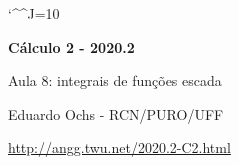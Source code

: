\documentclass[oneside,12pt]{article}
\begin{document}
\catcode`\^^J=10

\pu

\long{}
\long{}
\long{}
\long{}
\long{}
\long{}
\long{}
\long{}
\long{}
\long{}
\long{}

\long{}
\long{}

\def\frown{\ensuremath{{=}{(}}}
\def\True {\mathbf{V}}
\def\False{\mathbf{F}}
\def\D    {\displaystyle}

\def\drafturl{http://angg.twu.net/LATEX/2020-2-C2.pdf}
\def\drafturl{http://angg.twu.net/2020.2-C2.html}
\def\draftfooter{\tiny \href{\drafturl}{\jobname{}} \ColorBrown{\shorttoday{} \hours}}


\def\Intover #1#2{\overline {∫}_{#1}#2\,dx}
\def\Intunder#1#2{\underline{∫}_{#1}#2\,dx}
\def\Intoverunder#1#2{\Intover{#1}{#2} - \Intunder{#1}{#2}}
%
\def\Intxover #1#2#3{\overline {∫}_{x=#1}^{x=#2}#3\,dx}
\def\Intxunder#1#2#3{\underline{∫}_{x=#1}^{x=#2}#3\,dx}



%

\thispagestyle{empty}

\begin{center}

\vspace*{1.2cm}

{\bf \Large Cálculo 2 - 2020.2}

\bsk

Aula 8: integrais de funções escada

\bsk

Eduardo Ochs - RCN/PURO/UFF

\url{http://angg.twu.net/2020.2-C2.html}

\end{center}
\end{document}

